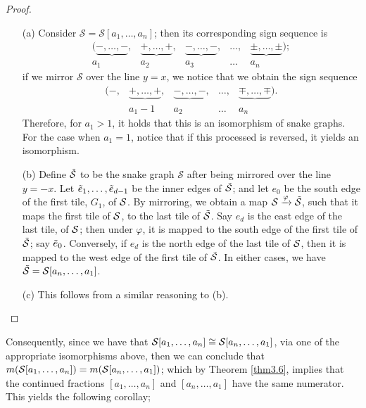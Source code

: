 \begin{proof}
\begin{itemize}
    \item[(a)] Consider $\mathcal{S} = \mathcal{S}[a_1,\dots,a_n]$; then its corresponding sign sequence is 
    \begin{equation*}
        \begin{array}{cccccccc}
  ( \underbrace{ -,\ldots,-},&  \underbrace{ + ,\dots, +},&  \underbrace{ -,\ldots,-},& \ldots,&  \underbrace{\pm,\ldots,\pm}) ;  \\
 a_1 & a_2 & a_3&\ldots&a_n
\end{array}
    \end{equation*}
    if we mirror $\mathcal{S}$ over the line $y = x$, we notice that we obtain the sign sequence
    \begin{equation*}
        \begin{array}{cccccccc}
  (  -,&  \underbrace{ + ,\dots, +},&  \underbrace{ -,\ldots,-},& \ldots,&  \underbrace{\mp,\ldots,\mp}) . \\
 &a_1 -1 & a_2 & \ldots&a_n
\end{array}
    \end{equation*}
    Therefore, for $a_1 > 1$, it holds that this is an isomorphism of snake graphs. For the case when $a_1 = 1$, notice that if this processed is reversed, it yields an isomorphism.
    \item[(b)] Define $\Tilde{\mathcal{S}}$ to be the snake graph $\mathcal{S}$ after being mirrored over the line $y = -x$. Let $\Tilde{e}_1,\dots,\Tilde{e}_{d-1}$ be the inner edges of $\Tilde{\mathcal{S}}$; and let $e_0$ be the south edge of the first tile, $G_1$, of $\mathcal{S}$. By mirroring, we obtain a map $\mathcal{S} \xrightarrow{\varphi} \Tilde{\mathcal{S}}$, such that it maps the first tile of $\mathcal{S}$, to the last tile of $\Tilde{\mathcal{S}}$. Say $e_d$ is the east edge of the last tile, of $\mathcal{S}$; then under $\varphi$, it is mapped to the south edge of the first tile of $\Tilde{\mathcal{S}}$; say $\Tilde{e}_0$. Conversely, if $e_d$ is the north edge of the last tile of $\mathcal{S}$, then it is mapped to the west edge of the first tile of $\Tilde{\mathcal{S}}$. In either cases, we have $\Tilde{\mathcal{S}} = \mathcal{S}[a_n,\dots,a_1]$.
    \item[(c)] This follows from a similar reasoning to (b).
\end{itemize}
\end{proof}
Consequently, since we have that $\mathcal{S}[a_1,\dots,a_n] \cong \mathcal{S}[a_n,\dots,a_1]$, via one of the appropriate isomorphisms above, then we can conclude that $m(\mathcal{S}[a_1,\dots,a_n]) = m(\mathcal{S}[a_n,\dots,a_1])$; which by Theorem \ref{thm3.6}, implies that the continued fractions $[a_1,\dots,a_n]$ and $[a_n,\dots,a_1]$ have the same numerator. This yields the following corollay;
